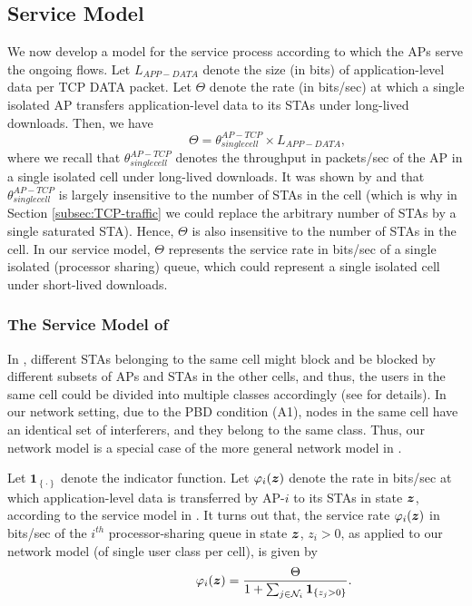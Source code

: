 \documentclass[10pt,a4paper,journal]{IEEEtran}
\theoremstyle{definition}
\theoremstyle{remark}
\theoremstyle{plain}
\newcommand{\bmath}[1]{\mbox{\boldmath$#1$}}
\newcommand{\ind}[1]{\mathbf{1}_{\left\{#1\right\}}}
\begin{document}
\subsection{Service Model}
\label{subsubsec:our-service-model-short-flows}

We now develop a model for the service process according to which the APs serve the ongoing flows. Let $L_{APP-DATA}$ denote the size (in bits) of application-level data per TCP DATA packet. Let $\Theta$ denote the rate (in bits/sec) at which a single isolated AP transfers application-level data to its STAs under long-lived downloads. Then, we have 
\[\quad \quad \quad \quad \quad \Theta = \theta_{singlecell}^{AP-TCP} \times L_{APP-DATA},\] 
where we recall that $\theta_{singlecell}^{AP-TCP}$ denotes the throughput in packets/sec of the AP in a single isolated cell under long-lived downloads. It was shown by \cite{wanet.harsha07WiNet} and \cite{wanet.bruno08TCPeqvSatModel} that $\theta_{singlecell}^{AP-TCP}$ is largely insensitive to the number of STAs in the cell (which is why in Section \ref{subsec:TCP-traffic} we could replace the arbitrary number of STAs by a single saturated STA). Hence, $\Theta$ is also insensitive to the number of STAs in the cell. In our service model, $\Theta$ represents the service rate in bits/sec of a single isolated (processor sharing) queue, which could represent a single isolated cell under short-lived downloads. 



\subsubsection{The Service Model of \cite{wanet.bonald08multicellprocsharing}}
\label{subsubsec:inaccuracy-Bonald-service-model}



In \cite{wanet.bonald08multicellprocsharing}, different STAs belonging to the same cell might block and be blocked by different subsets of APs and STAs in the other cells, and thus, the users in the same cell could be divided into multiple classes accordingly (see \cite{wanet.bonald08multicellprocsharing} for details). In our network setting, due to the PBD condition (A1), nodes in the same cell have an identical set of interferers, and they belong to the same class. Thus, our network model is a special case of the more general network model in \cite{wanet.bonald08multicellprocsharing}. 

Let $\ind{\cdot}$ denote the indicator function. Let $\varphi_i(\bmath{z})$ denote the rate in bits/sec at which application-level data is transferred by AP-$i$ to its STAs in state $\bmath{z}$, according to the service model in \cite{wanet.bonald08multicellprocsharing}. It turns out that, the service rate $\varphi_i(\bmath{z})$ in bits/sec of the $i^{th}$ processor-sharing queue in state $\bmath{z}$, $z_i >0$, as applied to our network model (of single user class per cell), is given by 
\begin{equation}
\label{eqn:phi-bonald-service-for-single-class-per-cell}
\quad \quad \quad \quad \quad \quad \varphi_i(\bmath{z}) = \frac{\Theta}{1 + \sum_{j \in \mathcal{N}_i} \ind{z_j > 0}}.
\end{equation}
\end{document}
